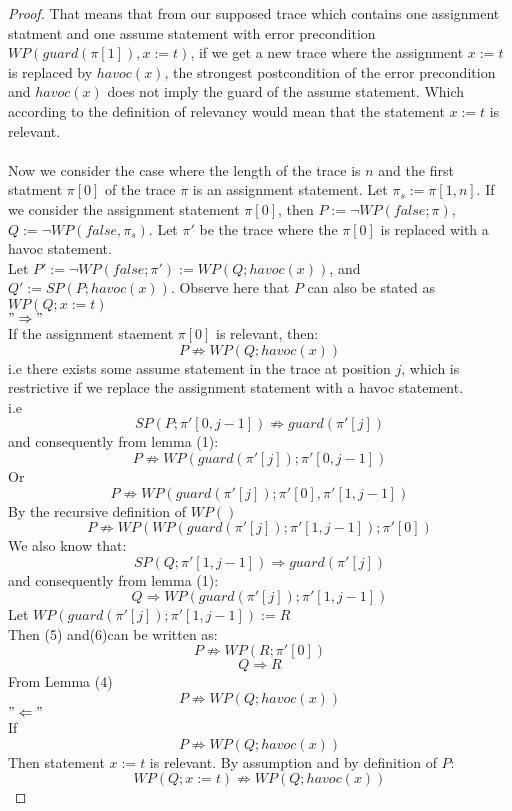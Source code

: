 \documentclass{article}
\newcommand{\limp}{\Rightarrow}
\begin{document}
\begin{proof}
That means that from our supposed trace which contains one assignment statment and one assume statement with error precondition $WP(guard(\pi[1]),x:=t)$, if we get a new trace where the assignment $x:=t$ is replaced by $havoc(x)$, the strongest postcondition of the error precondition and $havoc(x)$ does not imply the guard of the assume statement. Which according to the definition of relevancy would mean that the statement $x:=t$ is relevant.\\
\\Now we consider the case where the length of the trace is $n$ and the first statment $\pi[0]$ of the trace $\pi$ is an assignment statement. Let $\pi_s := \pi[1,n]$. If we consider the assignment statement $\pi[0]$, then $P := \neg WP(false; \pi)$, $Q := \neg WP(false, \pi_s)$. Let $\pi'$ be the trace where the $\pi[0]$ is replaced with a havoc statement. \\
Let $P' := \neg WP(false; \pi') := WP(Q; havoc(x))$, and $Q' := SP(P; havoc(x))$. Observe here that $P$ can also be stated as $WP(Q;x:=t)$\\
$"\Rightarrow"$\\
If the assignment staement $\pi[0]$ is relevant, then:
$$P \not\limp WP(Q;havoc(x))$$ 
i.e there exists some assume statement in the trace at position $j$, which is restrictive if we replace the assignment statement with a havoc statement.\\
i.e 
$$SP(P;\pi'[0,j-1]) \not\limp guard(\pi'[j]) $$
and consequently from lemma (1):
$$P \not\limp WP(guard(\pi'[j]);\pi'[0,j-1])$$
Or 
$$P \not\limp WP(guard(\pi'[j]);\pi'[0],\pi'[1,j-1])$$
By the recursive definition of $WP()$
\begin{equation} 
P \not\limp WP( WP(guard(\pi'[j]);\pi'[1,j-1]);\pi'[0])
\end{equation}
We also know that: 
$$SP(Q; \pi'[1,j-1]) \limp guard(\pi'[j])$$
and consequently from lemma (1):
\begin{equation} 
Q \limp WP(guard(\pi'[j]); \pi'[1,j-1])
\end{equation}
Let $WP(guard(\pi'[j]); \pi'[1,j-1]) := R$\\
Then (5) and(6)can be written as:
$$P \not\limp WP( R;\pi'[0])$$
$$Q \limp R$$
From Lemma (4)
\begin{equation} 
P \not\limp WP(Q; havoc(x))
\end{equation}
$"\Leftarrow"$\\
If $$P \not\limp WP(Q; havoc(x))$$
Then statement $x:=t$ is relevant.
By assumption and by definition of $P$:
$$WP(Q; x:=t) \not\limp WP(Q; havoc(x))$$

\end{proof}
\end{document}
